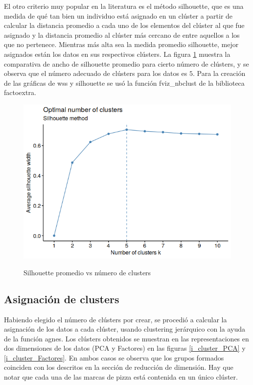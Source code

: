El otro criterio muy popular en la literatura es el método silhouette, que es una medida de qué tan bien un individuo está asignado en un clúster a partir de calcular la distancia promedio a cada uno de los elementos del clúster al que fue asignado y la distancia promedio al clúster más cercano de entre aquellos a los que no pertenece. Mientras más alta sea la medida promedio silhouette, mejor asignados están los datos en sus respectivos clústers. La figura \ref{i_cluster_Silhouette} muestra la comparativa de ancho de silhouette promedio para cierto número de clústers, y se observa que el número adecuado de clústers para los datos es $5$. Para la creación de las gráficas de wss y silhouette se usó la función \textsf{fviz\_nbclust} de la biblioteca factoextra.


\begin{figure}[h]
\centering
	\includegraphics[scale=.5]{images/clusterSilhouette.png} 
	\label{i_cluster_Silhouette}
	\caption{Silhouette promedio vs número de clusters}
\end{figure}

\pagebreak
\subsection{Asignación de clusters}

Habiendo elegido el número de clústers por crear, se procedió a calcular la asignación de los datos a cada clúster, usando clustering jerárquico con la ayuda de la función \textsf{agnes}. Los clústers obtenidos se muestran en las representaciones en dos dimensiones de los datos (PCA y Factores) en las figuras \ref{i_cluster_PCA} y \ref{i_cluster_Factores}. En ambos casos se observa que los grupos formados coinciden con los descritos en la sección de reducción de dimensión. Hay que notar que cada una de las marcas de pizza está contenida en un único clúster.

